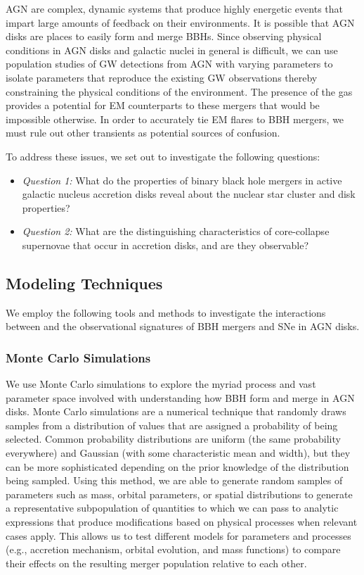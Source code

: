 AGN are complex, dynamic systems that produce highly energetic events that impart large amounts of feedback on their environments.
It is possible that AGN disks are places to easily form and merge BBHs.
Since observing physical conditions in AGN disks and galactic nuclei in general is difficult, we can use population studies of GW detections from AGN with varying parameters to isolate parameters that reproduce the existing GW observations thereby constraining the physical conditions of the environment.
The presence of the gas provides a potential for EM counterparts to these mergers that would be impossible otherwise.
In order to accurately tie EM flares to BBH mergers, we must rule out other transients as potential sources of confusion.

\noindent To address these issues, we set out to investigate the following questions:

\begin{itemize}
\item \emph{Question 1:} What do the properties of binary black hole mergers in active galactic nucleus accretion disks reveal about the nuclear star cluster and disk properties?

\item \emph{Question 2:} What are the distinguishing characteristics of core-collapse supernovae that occur in accretion disks, and are they observable?
\end{itemize}




\subsection{Modeling Techniques}

We employ the following tools and methods to investigate the interactions between and the observational signatures of BBH mergers and SNe in AGN disks.

\subsubsection{Monte Carlo Simulations}

We use Monte Carlo simulations to explore the myriad process and vast parameter space involved with understanding how BBH form and merge in AGN disks.
Monte Carlo simulations are a numerical technique that randomly draws samples from a distribution of values that are assigned a probability of being selected.
Common probability distributions are uniform (the same probability everywhere) and Gaussian (with some characteristic mean and width), but they can be more sophisticated depending on the prior knowledge of the distribution being sampled.
Using this method, we are able to generate random samples of parameters such as mass, orbital parameters, or spatial distributions to generate a representative subpopulation of quantities to which we can pass to analytic expressions that produce modifications based on physical processes when relevant cases apply.
This allows us to test different models for parameters and processes (e.g., accretion mechanism, orbital evolution, and mass functions) to compare their effects on the resulting merger population relative to each other.

